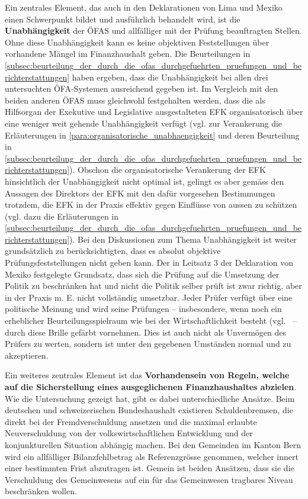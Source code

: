 \documentclass[10pt]{article}
\begin{document}
Ein zentrales Element, das auch in den Deklarationen von Lima und Mexiko einen Schwerpunkt bildet und ausführlich behandelt wird, ist die \textbf{Unabhängigkeit} der ÖFAS und allfälliger mit der Prüfung beauftragten Stellen. Ohne diese Unabhängigkeit kann es keine objektiven Feststellungen über vorhandene Mängel im Finanzhaushalt geben. Die Beurteilungen in \vref{subsec:beurteilung_der_durch_die_ofas_durchgefuehrten_pruefungen_und_berichterstattungen} haben ergeben, dass die Unabhängigkeit bei allen drei untersuchten ÖFA-Systemen ausreichend gegeben ist. Im Vergleich mit den beiden anderen ÖFAS muss gleichwohl festgehalten werden, dass die als Hilfsorgan der Exekutive und Legislative ausgestalteten EFK organisatorisch über eine weniger weit gehende Unabhängigkeit verfügt (vgl. zur Verankerung die Erläuterungen in \vref{para:organisatorische_unabhaengigkeit} und deren Beurteilung in \vref{subsec:beurteilung_der_durch_die_ofas_durchgefuehrten_pruefungen_und_berichterstattungen}). Obschon die organisatorische Verankerung der EFK hinsichtlich der Unabhängigkeit nicht optimal ist, gelingt es aber gemäss den Aussagen des Direktors der EFK mit den dafür vorgesehen Bestimmungen trotzdem, die EFK in der Praxis effektiv gegen Einflüsse von aussen zu schützen (vgl. dazu die Erläuterungen in \vref{subsec:beurteilung_der_durch_die_ofas_durchgefuehrten_pruefungen_und_berichterstattungen}). Bei den Diskussionen zum Thema Unabhängigkeit ist weiter grundsätzlich zu berücksichtigten, dass es absolut objektive Prüfungsfeststellungen nicht geben kann. Der in Leitsatz 3 der Deklaration von Mexiko festgelegte Grundsatz, dass sich die Prüfung auf die Umsetzung der Politik zu beschränken hat und nicht die Politik selber prüft ist zwar richtig, aber in der Praxis m. E. nicht vollständig umsetzbar. Jeder Prüfer verfügt über eine politische Meinung und wird seine Prüfungen -- insbesondere, wenn noch ein erheblicher Beurteilungsspielraum wie bei der Wirtschaftlichkeit besteht (vgl.~\cite[S. 154]{Koller2002} -- durch diese Brille gefärbt vornehmen. Dies ist auch nicht als Unvermögen des Prüfers zu werten, sondern ist unter den gegebenen Umständen normal und zu akzeptieren.

Ein weiteres zentrales Element ist das \textbf{Vorhandensein von Regeln, welche auf die Sicherstellung eines ausgeglichenen Finanzhaushaltes abzielen}. Wie die Untersuchung gezeigt hat, gibt es dabei unterschiedliche Ansätze. Beim deutschen und schweizerischen Bundeshaushalt existieren Schuldenbremsen, die direkt bei der Fremdverschuldung ansetzen und die maximal erlaubte Neuverschuldung von der volkswirtschaftlichen Entwicklung und der konjunkturellen Situation abhängig machen. Bei den Gemeinden im Kanton Bern wird ein allfälliger Bilanzfehlbetrag als Referenzgrösse genommen, welcher innert einer bestimmten Frist abzutragen ist. Gemein ist beiden Ansätzen, dass sie die Verschuldung des Gemeinwesens auf ein für das Gemeinwesen tragbares Niveau beschränken wollen.
\end{document}
